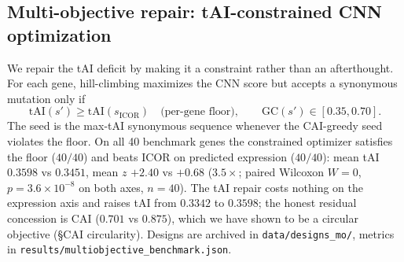 \subsection{Multi-objective repair: tAI-constrained CNN optimization}
We repair the tAI deficit by making it a constraint rather than an afterthought. For each gene, hill-climbing maximizes the CNN score but accepts a synonymous mutation only if
\begin{equation}
\mathrm{tAI}(s') \ge \mathrm{tAI}(s_{\mathrm{ICOR}}) \quad\text{(per-gene floor)},\qquad
\mathrm{GC}(s')\in[0.35,0.70].
\end{equation}
The seed is the max-tAI synonymous sequence whenever the CAI-greedy seed violates the floor. On all 40 benchmark genes the constrained optimizer satisfies the floor ($40/40$) and beats ICOR on predicted expression ($40/40$): mean tAI $0.3598$ vs $0.3451$, mean $z$ $+2.40$ vs $+0.68$ ($3.5\times$; paired Wilcoxon $W=0$, $p=3.6\times10^{-8}$ on both axes, $n=40$). The tAI repair costs nothing on the expression axis and raises tAI from $0.3342$ to $0.3598$; the honest residual concession is CAI ($0.701$ vs $0.875$), which we have shown to be a circular objective (\S CAI circularity). Designs are archived in \texttt{data/designs\_mo/}, metrics in \texttt{results/multiobjective\_benchmark.json}.
